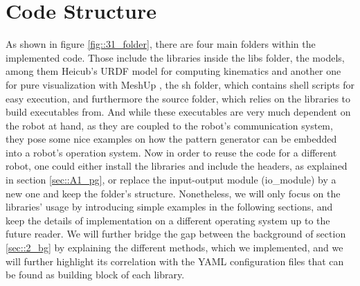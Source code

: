 \section{Code Structure}
\label{sec::31_cs}
As shown in figure \ref{fig::31_folder}, there are four main folders within the implemented code. Those include the libraries inside the libs folder, the models, among them Heicub's URDF model for computing kinematics and another one for pure visualization with MeshUp \cite{meshup}, the sh folder, which contains shell scripts for easy execution, and furthermore the source folder, which relies on the libraries to build executables from. And while these executables are very much dependent on the robot at hand, as they are coupled to the robot's communication system, they pose some nice examples on how the pattern generator can be embedded into a robot's operation system. Now in order to reuse the code for a different robot, one could either install the libraries and include the headers, as explained in section \ref{sec::A1_pg}, or replace the input-output module (io\_module) by a new one and keep the folder's structure. Nonetheless, we will only focus on the libraries' usage by introducing simple examples in the following sections, and keep the details of implementation on a different operating system up to the future reader. We will further bridge the gap between the background of section \ref{sec::2_bg} by explaining the different methods, which we implemented, and we will further highlight its correlation with the YAML \cite{ben2005yaml} configuration files that can be found as building block of each library. 
